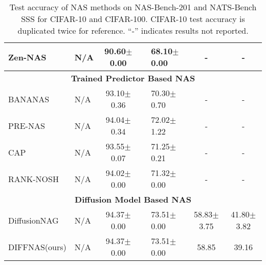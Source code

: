 \begin{table*}
\begin{adjustbox}{width=1.3\columnwidth,center}
\begin{tabular}{@{}llcllcc@{}}
                Zen-NAS~\cite{lin2021zen}          & N/A    & 90.60$\pm$0.00 && 68.10$\pm$0.00 & - & - \\
                \midrule
                \multicolumn{7}{c}{\textbf{Trained Predictor Based NAS}}\\
                BANANAS~\cite{white2019bananas}   & N/A    & 93.10$\pm$0.36 && 70.30$\pm$0.70 & - & - \\
                PRE-NAS~\citep{peng2022pre}       & N/A    & 94.04$\pm$0.34 && 72.02$\pm$1.22 & - & - \\
                CAP~\cite{li2023composing}        & N/A    & 93.55$\pm$0.07 && 71.25$\pm$0.21 & - & - \\
                RANK-NOSH~\citep{wang2021rank}   & N/A    & 94.02$\pm$0.00 && 71.32$\pm$0.00 & - & - \\
                \midrule
                \multicolumn{7}{c}{\textbf{Diffusion Model Based NAS}}\\
                DiffusionNAG~\citep{an2023diffusionnag} & N/A    &94.37$\pm$0.00 && 73.51$\pm$0.00 & 58.83$\pm$3.75 & 41.80$\pm$3.82\\
                \midrule
                DIFFNAS(ours) & N/A & 94.37$\pm$0.00 && 73.51$\pm$0.00 & 58.85 & 39.16\\
            \midrule
            \end{tabular}
            \end{adjustbox}
            \caption{Test accuracy of NAS methods on NAS-Bench-201 and NATS-Bench SSS for CIFAR-10 and CIFAR-100. CIFAR-10 test accuracy is duplicated twice for reference. “-” indicates results not reported.}
            \label{tab:nas_comparison_test_copy2}
            \end{table*}


